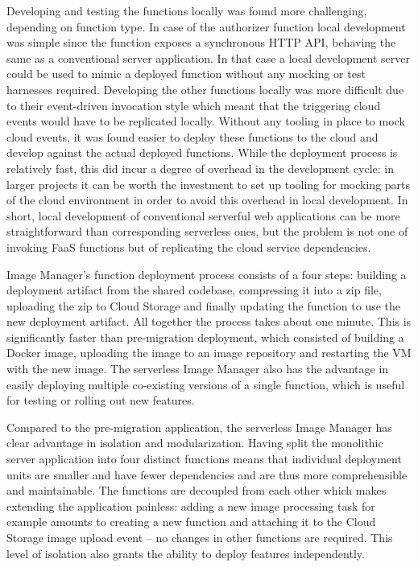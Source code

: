 Developing and testing the functions locally was found more challenging, depending on function type. In case of the authorizer function local development was simple since the function exposes a synchronous HTTP API, behaving the same as a conventional server application. In that case a local development server could be used to mimic a deployed function without any mocking or test harnesses required. Developing the other functions locally was more difficult due to their event-driven invocation style which meant that the triggering cloud events would have to be replicated locally. Without any tooling in place to mock cloud events, it was found easier to deploy these functions to the cloud and develop against the actual deployed functions. While the deployment process is relatively fast, this did incur a degree of overhead in the development cycle: in larger projects it can be worth the investment to set up tooling for mocking parts of the cloud environment in order to avoid this overhead in local development. In short, local development of conventional serverful web applications can be more straightforward than corresponding serverless ones, but the problem is not one of invoking FaaS functions but of replicating the cloud service dependencies.

Image Manager's function deployment process consists of a four steps: building a deployment artifact from the shared codebase, compressing it into a zip file, uploading the zip to Cloud Storage and finally updating the function to use the new deployment artifact. All together the process takes about one minute. This is significantly faster than pre-migration deployment, which consisted of building a Docker image, uploading the image to an image repository and restarting the VM with the new image. The serverless Image Manager also has the advantage in easily deploying multiple co-existing versions of a single function, which is useful for testing or rolling out new features.

Compared to the pre-migration application, the serverless Image Manager has clear advantage in isolation and modularization. Having split the monolithic server application into four distinct functions means that individual deployment units are smaller and have fewer dependencies and are thus more comprehensible and maintainable. The functions are decoupled from each other which makes extending the application painless: adding a new image processing task for example amounts to creating a new function and attaching it to the Cloud Storage image upload event -- no changes in other functions are required. This level of isolation also grants the ability to deploy features independently.

